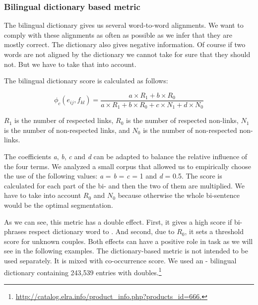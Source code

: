 \documentclass[output=paper,modfonts,nonflat]{langsci/langscibook}
\begin{document}
\subsubsection{Bilingual dictionary based metric}\label{sec:semmar:4.3.3}
The bilingual dictionary gives us several word-to-word alignments. We want to comply with these alignments as often as possible as we infer that they are mostly correct. %
The dictionary also gives negative  information. Of course if two words are not aligned by the dictionary we cannot take for sure that they should not. But we have to take that into account.

The bilingual dictionary score is calculated as follows:

\begin{equation}
\phi_c(e_{ij},f_{kl})=\frac{a\times R_1 + b\times R_0}{a\times R_1 + b\times R_0 + c\times N_1 + d\times N_0}
\end{equation}

$R_1$ is the number of respected links, $R_0$ is the number of respected non-links, $N_1$ is the number of non-respected links, and $N_0$ is the number of non-respected non-links.

The coefficients \textit{a}, \textit{b}, \textit{c} and \textit{d} can be adapted to balance the relative influence of the four terms. 
We analyzed a small corpus that allowed us to empirically choose the use of the following values:  \textit{a} = \textit{b} = \textit{c} = 1 and \textit{d} = 0.5. 
The score is calculated for each part of the bi- and then the two of them are multiplied. We have to take into account $R_0$ and $N_0$ because otherwise the whole bi-sentence would be the optimal segmentation.

As we can see, this metric has a double effect. 
First, it gives a high score if bi-phrases respect dictionary word to . 
And second, due to $R_0$, it sets a threshold score for unknown couples. 
Both effects can have a positive role in  task as we will see in the following examples. The dictionary-based metric is not intended to be used separately. It is mixed with 
co-occurrence score. We used an - bilingual dictionary containing 243,539 entries with doubles.\footnote{\url{http://catalog.elra.info/product_info.php?products_id=666.}}
\end{document}
